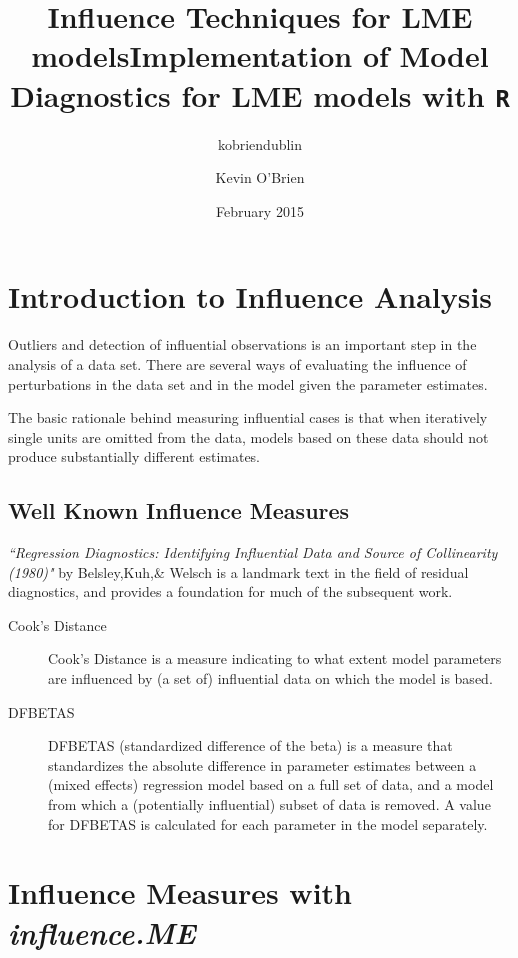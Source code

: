 \documentclass{article}
\title{Influence Techniques for  LME models}
\author{kobriendublin }
\date{February 2015}
\begin{document}
\author{Kevin O'Brien}
\title{Implementation of Model Diagnostics for LME models with \texttt{R}}

\tableofcontents
\newpage

\section{Introduction to Influence Analysis}

Outliers and detection of influential observations is an important step in the analysis of a data set. There are several ways of evaluating the influence of perturbations in the data set and in the model given the parameter estimates. 

The basic rationale behind measuring influential cases is that when iteratively single units are omitted
from the data, models based on these data should not produce substantially different estimates.
\subsection{Well Known Influence Measures}

\textit{``Regression Diagnostics: Identifying Influential Data
and Source of Collinearity (1980)"} by Belsley,Kuh,\& Welsch is a landmark text in the field of residual diagnostics, and
provides a foundation for much of the subsequent work.

\begin{description}
\item[Cook's Distance] Cook’s Distance is a measure indicating to what extent model parameters are influenced by (a set
of) influential data on which the model is based.
\item[DFBETAS] DFBETAS (standardized difference of the beta) is a measure that standardizes the absolute difference
in parameter estimates between a (mixed effects) regression model based on a full set of
data, and a model from which a (potentially influential) subset of data is removed. A value for
DFBETAS is calculated for each parameter in the model separately.
\end{description}


\newpage
\section{Influence Measures with \textit{influence.ME}}
\end{document}
